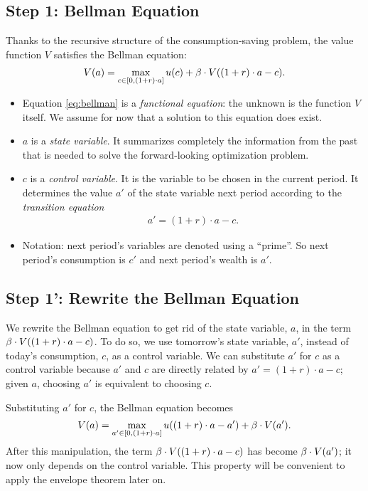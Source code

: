 \documentclass[letterpaper,12pt,leqno]{article}
\begin{document}
\subsection{Step 1: Bellman Equation}

Thanks to the recursive structure of the consumption-saving problem, the value function $V$ satisfies the Bellman equation:
\begin{align}
V(a)=\max_{c\in[0,(1+r)\cdot a]}u(c)+\b \cdot V((1+r)\cdot a-c)\label{eq:bellman}.
\end{align}

\begin{itemize}
\item Equation \eqref{eq:bellman} is a \textit{functional equation}: the unknown is the function $V$ itself.  We assume for now that a solution to this equation does exist.
\item $a$ is a \textit{state variable}. It summarizes completely the information from the past that is needed to solve the forward-looking optimization problem.
\item $c$ is a \textit{control variable}. It is the variable to be chosen in the current period. It determines the value $a'$ of the state variable next period according to the \textit{transition equation}
\begin{align*}
a'=(1+r)\cdot a-c.
\end{align*}
\item Notation: next period's variables are denoted using a ``prime''. So next period's consumption is $c'$ and next period's wealth is $a'$.
\end{itemize}

\subsection{Step 1': Rewrite the Bellman Equation}

We rewrite the Bellman equation to get rid of the state variable, $a$, in the term $\beta \cdot  V((1+r)\cdot a-c)$. To do so, we use tomorrow's state variable, $a'$, instead of today's consumption, $c$, as a control variable. We can substitute $a'$ for $c$ as a control variable because $a'$ and $c$ are directly related by $a'=(1+r)\cdot a-c$; given $a$, choosing $a'$ is equivalent to choosing $c$. 

Substituting $a'$ for $c$, the Bellman equation becomes
\begin{equation}
V(a)=\max_{a'\in[0,(1+r)\cdot a]} u((1+r)\cdot a-a')+\b  \cdot V(a').\label{eq:recursive}
\end{equation}
After this manipulation, the term $\beta \cdot  V((1+r)\cdot a-c)$ has become $\beta \cdot  V(a')$; it now only depends on the control variable. This property will be convenient to apply the envelope theorem later on.
\end{document}
